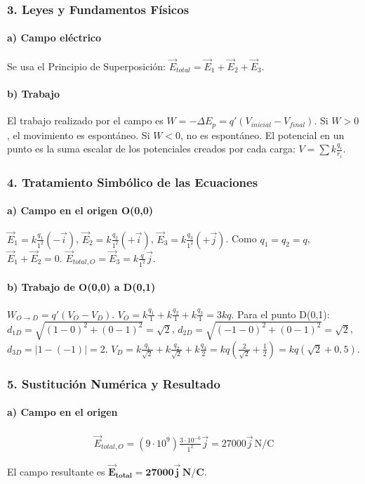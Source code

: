 \subsubsection*{3. Leyes y Fundamentos Físicos}
\paragraph{a) Campo eléctrico}
Se usa el Principio de Superposición: $\vec{E}_{total} = \vec{E}_1+\vec{E}_2+\vec{E}_3$.
\paragraph{b) Trabajo}
El trabajo realizado por el campo es $W = -\Delta E_p = q'(V_{inicial}-V_{final})$. Si $W>0$, el movimiento es espontáneo. Si $W<0$, no es espontáneo. El potencial en un punto es la suma escalar de los potenciales creados por cada carga: $V = \sum k\frac{q_i}{r_i}$.

\subsubsection*{4. Tratamiento Simbólico de las Ecuaciones}
\paragraph{a) Campo en el origen O(0,0)}
$\vec{E}_1 = k\frac{q_1}{1^2}(-\vec{i})$, $\vec{E}_2 = k\frac{q_2}{1^2}(+\vec{i})$, $\vec{E}_3 = k\frac{q_3}{1^2}(+\vec{j})$.
Como $q_1=q_2=q$, $\vec{E}_1+\vec{E}_2 = 0$.
$\vec{E}_{total,O} = \vec{E}_3 = k\frac{q}{1^2}\vec{j}$.

\paragraph{b) Trabajo de O(0,0) a D(0,1)}
$W_{O \to D} = q'(V_O - V_D)$.
$V_O = k\frac{q_1}{1} + k\frac{q_2}{1} + k\frac{q_3}{1} = 3kq$.
Para el punto D(0,1): $d_{1D} = \sqrt{(1-0)^2+(0-1)^2}=\sqrt{2}$, $d_{2D}=\sqrt{(-1-0)^2+(0-1)^2}=\sqrt{2}$, $d_{3D}=|1-(-1)|=2$.
$V_D = k\frac{q_1}{\sqrt{2}} + k\frac{q_2}{\sqrt{2}} + k\frac{q_3}{2} = kq\left(\frac{2}{\sqrt{2}} + \frac{1}{2}\right) = kq(\sqrt{2}+0,5)$.

\subsubsection*{5. Sustitución Numérica y Resultado}
\paragraph{a) Campo en el origen}
\begin{gather}
    \vec{E}_{total,O} = (9\cdot10^9)\frac{3\cdot10^{-6}}{1^2}\vec{j} = 27000\vec{j}\,\text{N/C}
\end{gather}
\begin{cajaresultado}
El campo resultante es $\boldsymbol{\vec{E}_{total} = 27000\vec{j}\,\textbf{N/C}}$.
\end{cajaresultado}

